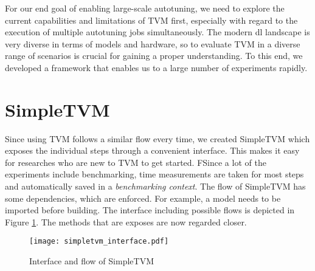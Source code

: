 For our end goal of enabling large-scale autotuning, we need to explore the current capabilities and limitations of TVM first, especially with regard to the execution of multiple autotuning jobs simultaneously. The modern \gls{dl} landscape is very diverse in terms of models and hardware, so to evaluate TVM in a diverse range of scenarios is crucial for gaining a proper understanding. To this end, we developed a framework that enables us to a large number of experiments rapidly.

\section{SimpleTVM}
Since using TVM follows a similar flow every time, we created SimpleTVM which exposes the individual steps through a convenient interface. This makes it easy for researches who are new to TVM to get started. FSince a lot of the experiments include benchmarking, time measurements are taken for most steps and automatically saved in a \textit{benchmarking context}. The flow of SimpleTVM has some dependencies, which are enforced. For example, a model needs to be imported before building. The interface including possible flows is depicted in Figure \ref{fig:simpletvm-interface}. The methods that are exposes are now regarded closer.

\begin{figure}
	\centering
	\texttt{[image: simpletvm\_interface.pdf]}%
	\caption{Interface and flow of SimpleTVM}
	\label{fig:simpletvm-interface}
\end{figure}

